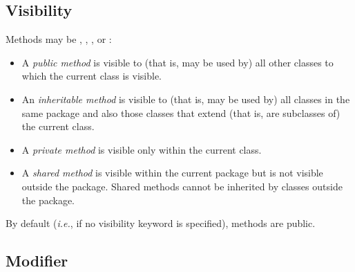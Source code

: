 \subsection{Visibility}
 
Methods may be , ,
, or :
\begin{itemize}
\item A \emph{public method} is visible to (that is, may be used by)
all other classes to which the current class is visible.
\item An \emph{inheritable method} is visible to (that is, may be used
by) all classes in the same package and also those classes that extend
(that is, are subclasses of) the current class.
\item A \emph{private method} is visible only within the current
class.
\item 
A \emph{shared method} is visible within the current package
but is not visible outside the package.  Shared methods cannot be
inherited by classes outside the package.
\end{itemize}
 
By default (\emph{i.e.}, if no visibility keyword is specified),  methods
are public.
\subsection{Modifier}
 
